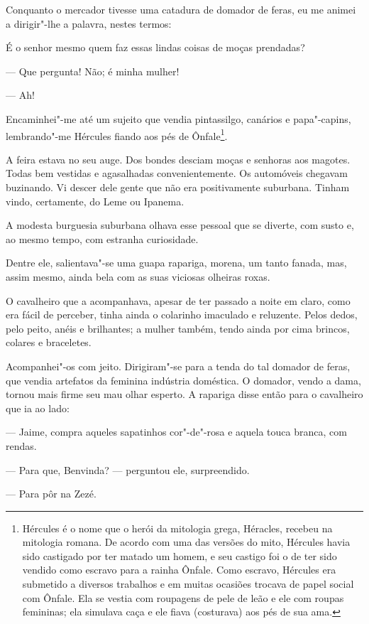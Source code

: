 Conquanto o mercador tivesse uma catadura de domador de feras, eu me
animei a dirigir"-lhe a palavra, nestes termos:

É o senhor mesmo quem faz essas lindas coisas de moças prendadas?

--- Que pergunta! Não; é minha mulher!

--- Ah!

Encaminhei"-me até um sujeito que vendia pintassilgo, canários e
papa"-capins, lembrando"-me Hércules fiando aos pés de Ônfale\footnote{Hércules
  é o nome que o herói da mitologia grega, Héracles, recebeu na
  mitologia romana. De acordo com uma das versões do mito, Hércules
  havia sido castigado por ter matado um homem, e seu castigo foi o de
  ter sido vendido como escravo para a rainha Ônfale. Como escravo,
  Hércules era submetido a diversos trabalhos e em muitas ocasiões
  trocava de papel social com Ônfale. Ela se vestia com roupagens de
  pele de leão e ele com roupas femininas; ela simulava caça e ele fiava
  (costurava) aos pés de sua ama.}.

A feira estava no seu auge. Dos bondes desciam moças e senhoras aos
magotes. Todas bem vestidas e agasalhadas convenientemente. Os
automóveis chegavam buzinando. Vi descer dele gente que não era
positivamente suburbana. Tinham vindo, certamente, do Leme ou Ipanema.

A modesta burguesia suburbana olhava esse pessoal que se diverte, com
susto e, ao mesmo tempo, com estranha curiosidade.

Dentre ele, salientava"-se uma guapa rapariga, morena, um tanto fanada,
mas, assim mesmo, ainda bela com as suas viciosas olheiras roxas.

O cavalheiro que a acompanhava, apesar de ter passado a noite em claro,
como era fácil de perceber, tinha ainda o colarinho imaculado e
reluzente. Pelos dedos, pelo peito, anéis e brilhantes; a mulher também,
tendo ainda por cima brincos, colares e braceletes.

Acompanhei"-os com jeito. Dirigiram"-se para a tenda do tal domador de
feras, que vendia artefatos da feminina indústria doméstica. O domador,
vendo a dama, tornou mais firme seu mau olhar esperto. A rapariga disse
então para o cavalheiro que ia ao lado:

--- Jaime, compra aqueles sapatinhos cor"-de"-rosa e aquela touca branca,
com rendas.

--- Para que, Benvinda? --- perguntou ele, surpreendido.

--- Para pôr na Zezé.

